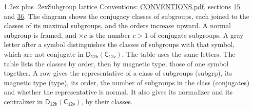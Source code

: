 \documentclass[10pt,a4paper]{article}
\makeatletter
\renewcommand\section{\@startsection{section}{1}{\z@}{-3ex plus -1ex minus -.2ex}%
  {1.2ex plus .2ex}{\normalfont\large\sffamily\bfseries\color{parttitle}}}
\numberwithin{equation}{section}
\newcommand{\grp}[1]{\mathsf{#1}}
\makeatother
\begin{document}
\section{Subgroup lattice}\label{s:subgroups}
Conventions: \href{../../CONVENTIONS.pdf}{CONVENTIONS.pdf}, sections \href{../../../rotation/CONVENTIONS.pdf\#conv.15}{15} and \href{../../CONVENTIONS.pdf\#conv.36}{36}.
The diagram shows the conjugacy classes of subgroups, each joined to the classes of its maximal subgroups, and the orders increase upward. \label{n:index.conjugates.c}\label{n:mark.conjugates}A normal subgroup is framed, and ${\times}c$ is the number $c > 1$ of conjugate subgroups. \label{n:mark.letter}A gray letter after a symbol distinguishes the classes of subgroups with that symbol, which are not conjugate in $\grp{D_{12h}}(\grp{C_{12v}})$. The table uses the same letters. The table lists the classes by order, then by magnetic type, those of one symbol together. \label{n:head.subgroup}\label{n:head.magnetic.type}\label{n:head.order}\label{n:head.conjugates}\label{n:head.normal}A row gives the representative of a class of subgroups (subgrp), its magnetic type (type), its order, the number of subgroups in the class (conjugates) and whether the representative is normal. \label{n:head.normalizer}\label{n:head.centralizer}It also gives its normalizer and its centralizer in $\grp{D_{12h}}(\grp{C_{12v}})$, by their classes. 
\end{document}
